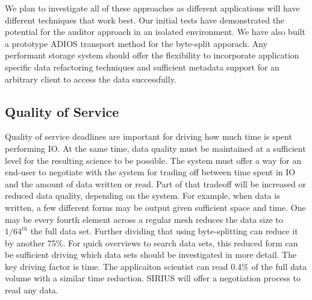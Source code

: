 \documentclass[letterpaper,twocolumn,10pt]{article}
\begin{document}
We plan to investigate all of these approaches as different applications will
have different techniques that work best. Our initial tests have demonstrated
the potential for the auditor approach in an isolated environment. We have also
built a prototype ADIOS transport method for the byte-split apporach. Any
performant storage system should offer the flexibility to incorporate
application specific data refactoring techniques and sufficient metadata
support for an arbitrary client to access the data successfully.

\subsection{Quality of Service}
Quality of service deadlines are important for driving how much time is spent
performing IO. At the same time, data quality must be maintained at a
sufficient level for the resulting science to be possible.  The system must
offer a way for an end-user to negotiate with the system for trading off
between time spent in IO and the amount of data written or read.  Part of that
tradeoff will be increased or reduced data quality, depending on the system.
For example, when data is written, a few different forms may be output given
sufficient space and time. One may be every fourth element across a regular
mesh reduces the data size to $1/64^{th}$ the full data set.  Further dividing
that using byte-splitting can reduce it by another 75\%. For quick overviews to
search data sets, this reduced form can be sufficient driving which data sets
should be investigated in more detail. The key driving factor is time. The
applicaiton scientist can read 0.4\% of the full data volume with a similar
time reduction. SIRIUS will offer a negotiation process to read any data.
\end{document}
